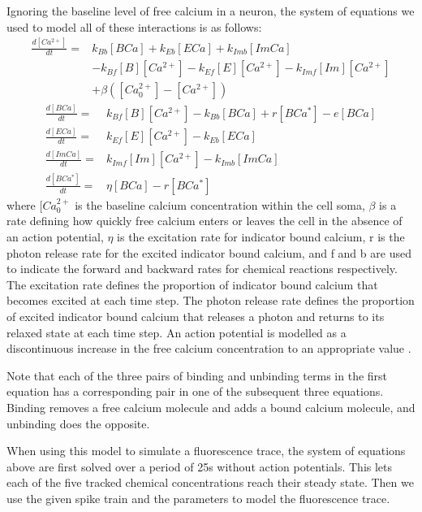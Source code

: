 \documentclass[a4paper,12pt]{article}
\theoremstyle{definition}
\newcommand{\diff}[2]{\frac{d #1}{d #2}}%
\begin{document}
Ignoring the baseline level of free calcium in a neuron, the system of equations we used to model all of these interactions is as follows:
\begin{equation} \label{eq:model_equations}
  \begin{split}
  \diff{[Ca^{2+}]}{t} = & k_{Bb}[BCa] + k_{Eb}[ECa] + k_{Imb}[ImCa] \\
                      & - k_{Bf}[B][Ca^{2+}]- k_{Ef} [E][Ca^{2+}] - k_{Imf}[Im][Ca^{2+}] \\
                      & + \beta ([Ca^{2+}_{0}] - [Ca^{2+}])
  \end{split}
\end{equation}
\begin{align}
  \diff{[BCa]}{t} = & k_{Bf}[B][Ca^{2+}] - k_{Bb}[BCa] + r[BCa^{*}] - e[BCa] \\
  \diff{[ECa]}{t} = & k_{Ef}[E][Ca^{2+}] - k_{Eb}[ECa] \\
  \diff{[ImCa]}{t} = & k_{Imf}[Im][Ca^{2+}] - k_{Imb}[ImCa] \\
  \diff{[BCa^{*}]}{t} = & \eta[BCa] - r[BCa^{*}]
\end{align}
where $[Ca^{2+}_{0}$ is the baseline calcium concentration within the cell soma, $\beta$ is a rate defining how quickly free calcium enters or leaves the cell in the absence of an action potential, $\eta$ is the excitation rate for indicator bound calcium, r is the photon release rate for the excited indicator bound calcium, and f and b are used to indicate the forward and backward rates for chemical reactions respectively. The excitation rate defines the proportion of indicator bound calcium that becomes excited at each time step. The photon release rate defines the proportion of excited indicator bound calcium that releases a photon and returns to its relaxed state at each time step. An action potential is modelled as a discontinuous increase in the free calcium concentration to an appropriate value \cite{maravall}.

Note that each of the three pairs of binding and unbinding terms in the first equation has a corresponding pair in one of the subsequent three equations. Binding removes a free calcium molecule and adds a bound calcium molecule, and unbinding does the opposite.

When using this model to simulate a fluorescence trace, the system of equations above are first solved over a period of 25s without action potentials. This lets each of the five tracked chemical concentrations reach their steady state. Then we use the given spike train and the parameters to model the fluorescence trace.
\end{document}
